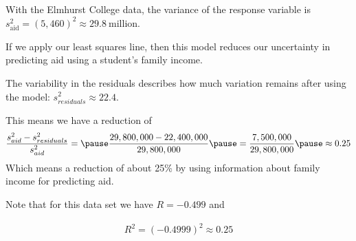 \documentclass{beamer}
\begin{document}
\begin{frame}
  \begin{example}
    With the Elmhurst College data, the variance of the response variable is $s_{\text{aid}}^2={(5,460)}^2\approx 29.8~\text{million}$.\pause

    \vspace{1mm}
    If we apply our least squares line, then this model reduces our uncertainty in predicting aid using a student's family income.\pause

    \vspace{1mm}
    The variability in the residuals describes how much variation remains after using the model: $s_{residuals}^2\approx 22.4$.\pause

    \vspace{1mm}
    This means we have a reduction of
    \begin{equation*}
      \begin{aligned}
        \dfrac{s_{aid}^2 - s_{residuals}^2}{s_{aid}^2} =\pause
        \dfrac{29,800,000 - 22,400,000}{29,800,000}\pause
        = \dfrac{7,500,000}{29,800,000}\pause
        \approx 0.25
      \end{aligned}
    \end{equation*}\pause
    Which means a reduction of about 25\% by using information about family income for predicting aid.\pause

    \vspace{1mm}
    Note that for this data set we have $R=-0.499$ and

    \vspace{-4mm}
    \begin{equation*}
      \begin{aligned}
        R^2 = {(-0.4999)}^2 \approx 0.25
      \end{aligned}
    \end{equation*}
  \end{example}
\end{frame}
\end{document}
